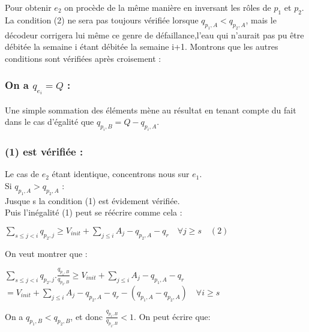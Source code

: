 \documentclass[a4paper]{report}
\begin{document}
 Pour obtenir $e_{2}$ on procède de la même manière en inversant les rôles de $p_{1}$ et $p_{2}$.\\
 La condition (2) ne sera pas toujours vérifiée lorsque $q_{p_{1},A}<q_{p_{2},A}$, mais le décodeur corrigera lui même ce genre de défaillance,l'eau qui n'aurait pas pu être débitée la semaine i étant débitée la semaine i+1. Montrons que les autres conditions sont vérifiées après croisement :\\
 \subsubsection*{On a $q_{e_{i}}=Q$ :}
 Une simple sommation des éléments mène au résultat en tenant compte du fait dans le cas d'égalité que  $q_{p_{i},B}=Q-q_{p_{i},A}$.\\
\subsubsection*{(1) est vérifiée :}
Le cas de $e_{2}$ étant identique, concentrons nous sur $e_{1}$.\\
 Si $q_{p_{1},A}> q_{p_{2},A}$ :\\
 Jusque s la condition  (1) est évidement vérifiée.\\
  Puis l'inégalité (1) peut se réécrire comme cela :\\
 \begin{center}
$\sum_{s\leq j <i}q_{p_{2},j}\geq V_{init} + \sum_{j\leq i}A_{j} - q_{p_{2},A} - q_{r}\quad \forall j \geq s \quad(2)$
 \end{center}
 On veut montrer que :\\
 \begin{center}
 $\sum_{s\leq j <i}q_{p_{2},j}.\frac{q_{p_{1},B}}{q_{p_{2},B}}\geq V_{init} + \sum_{j\leq i}A_{j} - q_{p_{1},A} - q_{r}$\\
 $=V_{init} + \sum_{j\leq i}A_{j} - q_{p_{2},A} - q_{r}-(q_{p_{1},A}-q_{p_{2},A})\quad \forall i \geq s$
 \end{center}

 On a  $q_{p_{1},B}<q_{p_{2},B}$, et donc $\frac{q_{p_{1},B}}{q_{p_{2},B}}<1$.  On peut écrire que:\\
 
\end{document}
